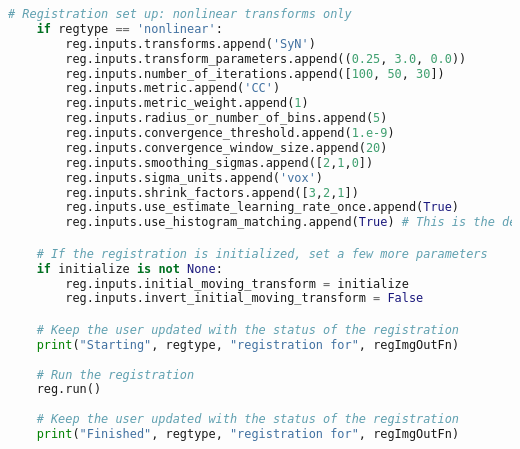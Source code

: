 \begin{lstlisting}[language=Python]
    # Registration set up: nonlinear transforms only
    if regtype == 'nonlinear':
        reg.inputs.transforms.append('SyN')
        reg.inputs.transform_parameters.append((0.25, 3.0, 0.0))
        reg.inputs.number_of_iterations.append([100, 50, 30])
        reg.inputs.metric.append('CC')
        reg.inputs.metric_weight.append(1)
        reg.inputs.radius_or_number_of_bins.append(5)
        reg.inputs.convergence_threshold.append(1.e-9)
        reg.inputs.convergence_window_size.append(20)
        reg.inputs.smoothing_sigmas.append([2,1,0])
        reg.inputs.sigma_units.append('vox')
        reg.inputs.shrink_factors.append([3,2,1])
        reg.inputs.use_estimate_learning_rate_once.append(True)
        reg.inputs.use_histogram_matching.append(True) # This is the default value, but specify it anyway

    # If the registration is initialized, set a few more parameters
    if initialize is not None:
        reg.inputs.initial_moving_transform = initialize
        reg.inputs.invert_initial_moving_transform = False

    # Keep the user updated with the status of the registration
    print("Starting", regtype, "registration for", regImgOutFn)
    
    # Run the registration
    reg.run()
    
    # Keep the user updated with the status of the registration
    print("Finished", regtype, "registration for", regImgOutFn)

\end{lstlisting}